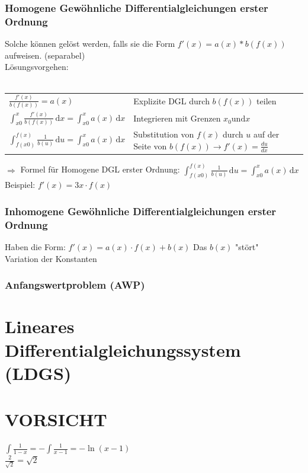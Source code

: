 \documentclass[a4paper,portrait]{scrartcl}
\begin{document}
\subsubsection{Homogene Gewöhnliche Differentialgleichungen erster Ordnung}
Solche können gelöst werden, falls sie die Form $f'(x) = a(x) * b(f(x)) $ aufweisen. (separabel) \\
Lösungsvorgehen: \\ \\
\begin{tabular}{ll}
	$\frac{f'(x)}{b(f(x))} = a(x)$ & Explizite DGL durch $b(f(x))$ teilen\\
	$\int_{x0}^{x}\!\frac{f'(x)}{b(f(x))}\,\mathrm{d}x = \int_{x0}^{x}\!a(x)\,\mathrm{d}x$ & Integrieren mit Grenzen $x_0 \text{und} x$ \\
	$\int_{f(x0)}^{f(x)}\!\frac{1}{b(u)}\,\mathrm{d}u = \int_{x0}^{x}\!a(x)\,\mathrm{d}x$&Substitution von $f(x)$ durch $u$ auf der Seite von $b(f(x)) \rightarrow f'(x) = \frac{du}{dx}$
\end{tabular}
$\Rightarrow$ Formel für Homogene DGL erster Ordnung: $\int_{f(x0)}^{f(x)}\!\frac{1}{b(u)}\,\mathrm{d}u = \int_{x0}^{x}\!a(x)\,\mathrm{d}x$\\
Beispiel: $f'(x) = 3x \cdot f(x)$ \\
\subsubsection{Inhomogene Gewöhnliche Differentialgleichungen erster Ordnung}
Haben die Form: $f'(x) = a(x) \cdot f(x) + b(x)$ Das $b(x)$ "stört" \\


Variation der Konstanten
\subsubsection{Anfangswertproblem (AWP)}

\section{Lineares Differentialgleichungssystem (LDGS)}

\section{VORSICHT}
$\int\frac{1}{1-x} = -\int\frac{1}{x-1} = -\ln(x-1)$ \\
$\frac{2}{\sqrt{2}} = \sqrt{2}$
\end{document}
